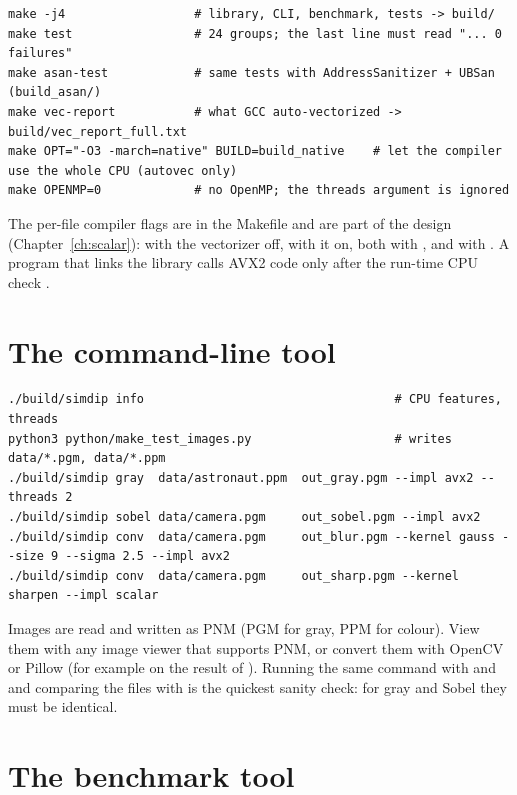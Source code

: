 \begin{lstlisting}[style=shell]
make -j4                  # library, CLI, benchmark, tests -> build/
make test                 # 24 groups; the last line must read "... 0 failures"
make asan-test            # same tests with AddressSanitizer + UBSan (build_asan/)
make vec-report           # what GCC auto-vectorized -> build/vec_report_full.txt
make OPT="-O3 -march=native" BUILD=build_native    # let the compiler use the whole CPU (autovec only)
make OPENMP=0             # no OpenMP; the threads argument is ignored
\end{lstlisting}

The per-file compiler flags are in the Makefile and are part of the design (Chapter~\ref{ch:scalar}):  with the vectorizer off,  with it on, both with , and  with . A program that links the library calls AVX2 code only after the run-time CPU check .

\section{The command-line tool}

\begin{lstlisting}[style=shell]
./build/simdip info                                   # CPU features, threads
python3 python/make_test_images.py                    # writes data/*.pgm, data/*.ppm
./build/simdip gray  data/astronaut.ppm  out_gray.pgm --impl avx2 --threads 2
./build/simdip sobel data/camera.pgm     out_sobel.pgm --impl avx2
./build/simdip conv  data/camera.pgm     out_blur.pgm --kernel gauss --size 9 --sigma 2.5 --impl avx2
./build/simdip conv  data/camera.pgm     out_sharp.pgm --kernel sharpen --impl scalar
\end{lstlisting}
Images are read and written as PNM (PGM for gray, PPM for colour). View them with any image viewer that supports PNM, or convert them with OpenCV or Pillow (for example  on the result of ). Running the same command with  and  and comparing the files with  is the quickest sanity check: for gray and Sobel they must be identical.

\section{The benchmark tool}

